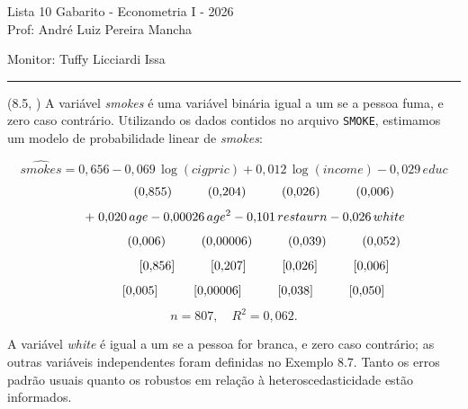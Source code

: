 \documentclass[12pt,letterpaper, onecolumn]{exam}
\begin{document}
\begingroup
\centering
\LARGE Lista 10 Gabarito - Econometria I - 2026\\[0.5em]
\large Prof: André Luiz Pereira Mancha \par
\large Monitor: Tuffy Licciardi Issa \par
\endgroup
\rule{\textwidth}{0.4pt}
\pointsdroppedatright
\printanswers
\renewcommand{\solutiontitle}{\noindent\textbf{Ans:}\enspace}
\newcommand{\qstar}{\hspace{-0.6em}\textsuperscript{*}\hspace{0.2em}}

\begin{questions}

\question (8.5, \citep{wooldridge2016}) A variável \textit{smokes} é uma variável binária igual a um se a pessoa fuma, e zero caso contrário. Utilizando os dados contidos no arquivo \texttt{SMOKE}, estimamos um modelo de probabilidade linear de \textit{smokes}:

\[
\widehat{smokes} = 0{,}656 - 0{,}069\,\log(cigpric) + 0{,}012\,\log(income) - 0{,}029\,educ
\]
\[
\hspace{1.7cm} (0{,}855)\hspace{1.0cm}(0{,}204)\hspace{1.0cm}(0{,}026)\hspace{1.0cm}(0{,}006)
\]
\[
\hspace{0.6cm} +\; 0{,}020\,age - 0{,}00026\,age^2 - 0{,}101\,restaurn - 0{,}026\,white
\]
\[
\hspace{1.7cm} (0{,}006)\hspace{1.0cm}(0{,}00006)\hspace{1.0cm}(0{,}039)\hspace{1.0cm}(0{,}052)
\]
\[
\hspace{1.7cm} [0{,}856]\hspace{1.0cm}[0{,}207]\hspace{1.0cm}[0{,}026]\hspace{1.0cm}[0{,}006]
\]
\[
\hspace{1.1cm} [0{,}005]\hspace{1.0cm}[0{,}00006]\hspace{1.0cm}[0{,}038]\hspace{1.0cm}[0{,}050]
\]
\[
n = 807,\quad R^2 = 0{,}062.
\]

A variável \textit{white} é igual a um se a pessoa for branca, e zero caso contrário; as outras variáveis independentes foram definidas no Exemplo 8.7. Tanto os erros padrão usuais quanto os robustos em relação à heteroscedasticidade estão informados.


\end{questions}
\end{document}
